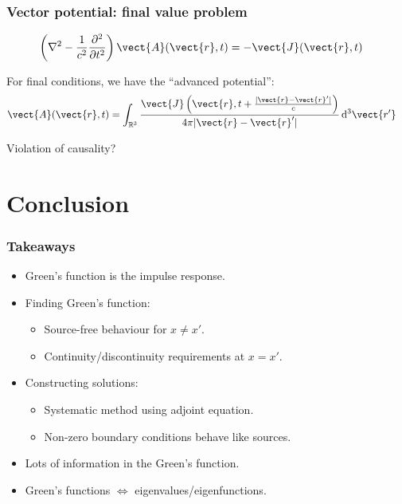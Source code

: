 \documentclass[12 pt, compress, handout, intlimits]{beamer}
\renewcommand{\d}{\operatorname{d}\!}
\begin{document}
\note{}

\begin{frame}[fragile]
    \frametitle{Vector potential: final value problem}
    
    \begin{align*}
        \left( \nabla^2 - \frac{1}{c^2} \frac{\partial^2}{\partial t^2} \right) \vect{A}(\vect{r}, t) &= - \vect{J}(\vect{r}, t)
    \end{align*}
    
    For final conditions, we have the ``advanced potential'':
    \begin{align*}
        \vect{A}(\vect{r}, t) &= \int_{\mathbb{R}^3} \frac{\vect{J}\left(\vect{r}, t + \frac{|\vect{r} - \vect{r}'|}{c}\right)}{4 \pi |\vect{r} - \vect{r}'|} \d^3 \vect{r'}
    \end{align*}

    Violation of causality?
    
\end{frame}

\note{}
\fi

\section{Conclusion}
\label{sec:conclusion}

\note{}

\begin{frame}[fragile]
    \frametitle{Takeaways}
    
    \begin{itemize}
    \item
        Green's function is the impulse response.
    \item
        Finding Green's function:
        \begin{itemize}
        \item
            Source-free behaviour for $ x \neq x' $.
        \item
            Continuity/discontinuity requirements at $ x = x' $.
        \end{itemize}
    \item
        Constructing solutions:
        \begin{itemize}
        \item
            Systematic method using adjoint equation.
        \item
            Non-zero boundary conditions behave like sources.
        \end{itemize}
    \item
        Lots of information in the Green's function.
    \item
        Green's functions $ \Longleftrightarrow $ eigenvalues/eigenfunctions.
    \end{itemize}
    

\end{frame}
\end{document}
